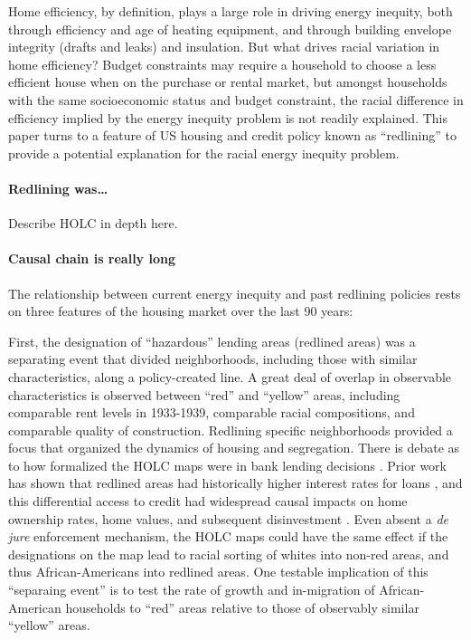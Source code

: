 \documentclass[
]{article}
\begin{document}
Home efficiency, by definition, plays a large role in driving energy inequity, both through efficiency and age of heating equipment, and through building envelope integrity (drafts and leaks) and insulation. But what drives racial variation in home efficiency? Budget constraints may require a household to choose a less efficient house when on the purchase or rental market, but amongst households with the same socioeconomic status and budget constraint, the racial difference in efficiency implied by the energy inequity problem is not readily explained. This paper turns to a feature of US housing and credit policy known as ``redlining'' to provide a potential explanation for the racial energy inequity problem.

\hypertarget{redlining-was}{%
\paragraph{Redlining was\ldots{}}\label{redlining-was}}

Describe HOLC in depth here.

\hypertarget{causal-chain-is-really-long}{%
\paragraph{Causal chain is really long}\label{causal-chain-is-really-long}}

The relationship between current energy inequity and past redlining policies rests on three features of the housing market over the last 90 years:

First, the designation of ``hazardous'' lending areas (redlined areas) was a separating event that divided neighborhoods, including those with similar characteristics, along a policy-created line. A great deal of overlap in observable characteristics is observed between ``red'' and ``yellow'' areas, including comparable rent levels in 1933-1939, comparable racial compositions, and comparable quality of construction. Redlining specific neighborhoods provided a focus that organized the dynamics of housing and segregation. There is debate as to how formalized the HOLC maps were in bank lending decisions \citep{Hillier2003, Fishback2020}. Prior work has shown that redlined areas had historically higher interest rates for loans \citep{Hillier2003}, and this differential access to credit had widespread causal impacts on home ownership rates, home values, and subsequent disinvestment \citep{Aaronson2021}. Even absent a \emph{de jure} enforcement mechanism, the HOLC maps could have the same effect if the designations on the map lead to racial sorting of whites into non-red areas, and thus African-Americans into redlined areas. One testable implication of this ``separaing event'' is to test the rate of growth and in-migration of African-American households to ``red'' areas relative to those of observably similar ``yellow'' areas.
\end{document}
